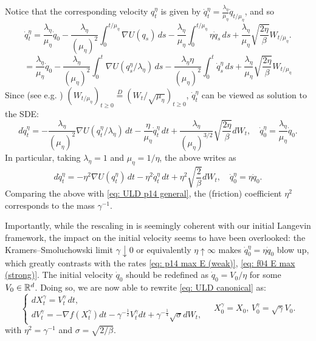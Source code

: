 \documentclass[12pt]{article}
\begin{document}
Notice that the corresponding velocity $q_t^{\eta}$ is given by $\dot{q}_t^{\eta} = \frac{\lambda_{\eta}}{\mu_{\eta}} \dot{q}_{t/\mu_{\eta}}$, and so
\[
\dot{q}_t^{\eta} = \frac{\lambda_{\eta}}{\mu_{\eta}} \dot{q}_0 - \frac{\lambda_{\eta}}{(\mu_{\eta})^2} \int_0^{t/\mu_{\eta}} \nabla U(q_s)\,ds - \frac{\lambda_{\eta}}{\mu_{\eta}} \int_0^{t/\mu_{\eta}} \eta \dot{q}_s\,ds + \frac{\lambda_{\eta}}{\mu_{\eta}} \sqrt{\frac{2\eta}{\beta}} W_{t/\mu_{\eta}}.
\]
\[
= \frac{\lambda_{\eta}}{\mu_{\eta}} \dot{q}_0 - \frac{\lambda_{\eta}}{(\mu_{\eta})^2} \int_0^t \nabla U(q_s^{\eta}/\lambda_{\eta})\,ds - \frac{\lambda_{\eta} \eta}{(\mu_{\eta})^2} \int_0^t \dot{q}_s^{\eta}\,ds + \frac{\lambda_{\eta}}{\mu_{\eta}} \sqrt{\frac{2\eta}{\beta}} W_{t/\mu_{\eta}}
\]
Since (see e.g. \cite{ks91}) $(W_{t/\mu_{\eta}})_{t \ge 0} \stackrel{D}{=} (W_{t}/\sqrt{\mu_{\eta}})_{t \ge 0}$, $\dot{q}_t^{\eta}$ can be viewed as solution to the SDE:
\[
d\dot{q}_t^{\eta} = -\frac{\lambda_{\eta}}{(\mu_{\eta})^2} \nabla U(q_t^{\eta}/\lambda_{\eta})\,dt - \frac{\eta}{\mu_{\eta}} \dot{q}_t^{\eta}\,dt + \frac{\lambda_{\eta}}{(\mu_{\eta})^{3/2}} \sqrt{\frac{2\eta}{\beta}} dW_t, \quad \dot{q}_0^{\eta} = \frac{\lambda_{\eta}}{\mu_{\eta}} \dot{q}_0.
\]
In particular, taking $\lambda_{\eta} = 1$ and $\mu_{\eta} = 1/\eta$, the above writes as
\[
d\dot{q}_t^{\eta} = -\eta^2 \nabla U(q_t^{\eta})\,dt - \eta^2 \dot{q}_t^{\eta}\,dt + \eta^2 \sqrt{\frac{2}{\beta}} dW_t, \quad \dot{q}_0^{\eta} = \eta \dot{q}_0.
\]
Comparing the above with \eqref{eq: ULD p14 general}, the (friction) coefficient $\eta^2$ corresponds to the mass $\gamma^{-1}$.

Importantly, while the rescaling in \cite{p14} is seemingly coherent with our initial Langevin framework, the impact on the initial velocity seems to have been overlooked: the Kramers--Smoluchowski limit $\gamma \downarrow 0$ or equivalently $\eta \uparrow \infty$ makes $\dot{q}_0^{\eta} = \eta \dot{q}_0$ blow up, which greatly contrasts with the rates \eqref{eq: p14 max E (weak)}, \eqref{eq: f04 E max (strong)}. The initial velocity $\dot{q}_0$ should be redefined as $\dot{q}_0 = V_0/\eta$ for some $V_0 \in {\mathbb{R}}^d$.
Doing so, we are now able to rewrite \eqref{eq: ULD canonical} as:
\begin{equation}
\label{eq: ULD p14 my}
\begin{cases}
dX_t^{\gamma} = V_t^{\gamma} \,dt, \\
dV_t^{\gamma} = -\nabla f(X_t^{\gamma})dt -\gamma^{-\frac{1}{2}}V_t^{\gamma}dt + \gamma^{-\frac{1}{4}}\sqrt{\sigma} dW_t,
\end{cases}\quad X_0^\gamma=X_0,\,V_0^\gamma= \sqrt{\gamma}V_0.
\end{equation}
with $\eta^2=\gamma^{-1}$ and $\sigma=\sqrt{2/\beta}$.\\
\end{document}
